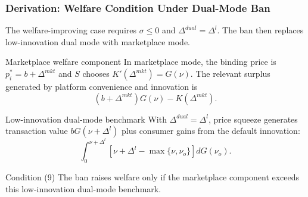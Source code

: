 \begin{frame}
  \frametitle{Derivation: Welfare Condition Under Dual-Mode Ban}
  \hypertarget{ban_welfare_condition_deriv}{}
  \scriptsize

  The welfare-improving case requires $\sigma\leq0$ and
  $\Delta^{dual}=\Delta^l$. The ban then replaces low-innovation dual mode
  with marketplace mode.

  \begin{block}{Marketplace welfare component}
    In marketplace mode, the binding price is $p_i^*=b+\Delta^{mkt}$ and
    $S$ chooses $K'(\Delta^{mkt})=G(\nu)$. The relevant surplus generated by
    platform convenience and innovation is
    \[
      (b+\Delta^{mkt})G(\nu)-K(\Delta^{mkt}).
    \]
  \end{block}

  \begin{block}{Low-innovation dual-mode benchmark}
    With $\Delta^{dual}=\Delta^l$, price squeeze generates transaction value
    $bG(\nu+\Delta^l)$ plus consumer gains from the default innovation:
    \[
      \int_0^{\nu+\Delta^l}
      \left[
        \nu+\Delta^l-\max\{\nu,\nu_o\}
      \right]dG(\nu_o).
    \]
  \end{block}

  \begin{alertblock}{Condition (9)}
    The ban raises welfare only if the marketplace component exceeds this
    low-innovation dual-mode benchmark.
  \end{alertblock}

  \hyperlink{ban_welfare_condition_src}{}
\end{frame}

